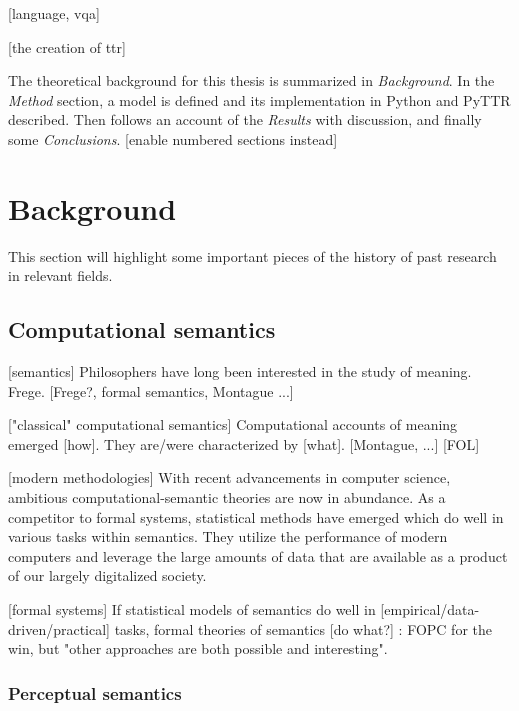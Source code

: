 \documentclass[11pt, a4paper]{article}
\begin{document}
[language, vqa]

[the creation of ttr]

The theoretical background for this thesis is summarized in \textit{Background}.
In the \textit{Method} section, a model is defined and its implementation in Python and PyTTR described.
Then follows an account of the \textit{Results} with discussion, and finally some \textit{Conclusions}.
[enable numbered sections instead]

\glsresetall
\section{Background}
\label{sec:background}

This section will highlight some important pieces of the history of past research in relevant fields.

\subsection{Computational semantics}

[semantics]
Philosophers have long been interested in the study of meaning.
Frege.
[Frege?, formal semantics, Montague ...]

["classical" computational semantics]
Computational accounts of meaning emerged [how].
They are/were characterized by [what].
[Montague, ...]
[FOL]
\citep{BlackburnComputationalsemantics2003}


[modern methodologies]
With recent advancements in computer science, ambitious computational-semantic theories are now in abundance.
As a competitor to formal systems, statistical methods have emerged which do well in various tasks within semantics.
They utilize the performance of modern computers and leverage the large amounts of data that are available as a product of our largely digitalized society.


[formal systems]
If statistical models of semantics do well in [empirical/data-driven/practical] tasks, formal theories of semantics [do what?]
\cite{BlackburnComputationalsemantics2003}:
FOPC for the win, but "other approaches are both possible and interesting".

\cite{HarnadSymbolGroundingProblem1990}





\subsubsection{Perceptual semantics}
\end{document}
